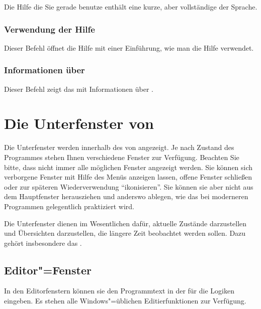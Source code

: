 Die Hilfe die Sie gerade benutze enthält eine kurze, aber vollständige
 der Sprache.

\subsection{Verwendung der Hilfe}\label{sec:MI_HELPONHELP}



Dieser Befehl öffnet die Hilfe mit einer Einführung, wie 
man die Hilfe verwendet.


\subsection{Informationen über \texorpdfstring{\mutabor}{Mutabor}}
\label{sec:MI_ABOUT}

Dieser Befehl zeigt das  mit Informationen 
über \mutabor{}.

\chapter{Die Unterfenster von \texorpdfstring{\mutabor}{Mutabor}}\label{sec:DE_SUBWINDOW}

Die Unterfenster werden innerhalb des
 von \mutabor{}
angezeigt. Je nach Zustand des Programmes stehen Ihnen verschiedene
Fenster zur Verfügung. Beachten Sie bitte, dass nicht immer alle
möglichen Fenster angezeigt werden. Sie können sich verborgene Fenster
mit Hilfe des Menüs  anzeigen lassen, offene
Fenster schließen oder zur späteren Wiederverwendung
"`ikonisieren"'. Sie können sie aber nicht aus dem Hauptfenster
herausziehen und anderswo ablegen, wie das bei moderneren Programmen
gelegentlich praktiziert wird.

Die Unterfenster dienen im Wesentlichen dafür, aktuelle Zustände
darzustellen und Übersichten darzustellen, die längere Zeit beobachtet
werden sollen. Dazu gehört insbesondere das
.



\section{Editor"=Fenster}\label{sec:DE_EDIT}
In den Editorfenstern können sie den Programmtext in der
 für die Logiken eingeben.
Es stehen alle Windows"=üblichen Editierfunktionen zur Verfügung.

